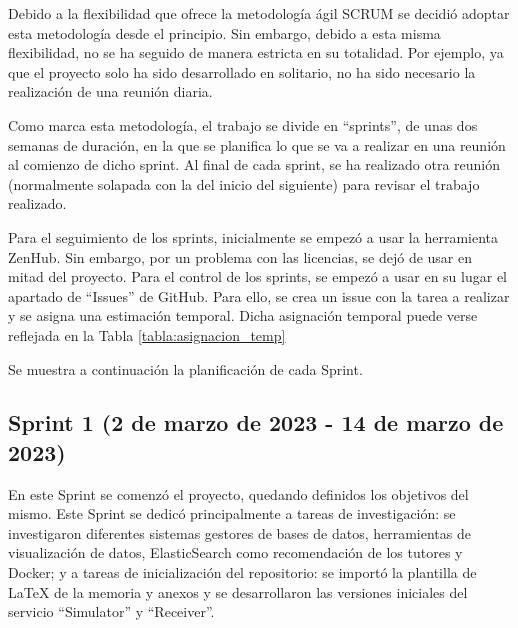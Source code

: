 Debido a la flexibilidad que ofrece la metodología ágil SCRUM \cite{schwaber2001agile} se decidió adoptar 
esta metodología desde el principio. Sin embargo, debido a esta misma flexibilidad, no se ha seguido de 
manera estricta en su totalidad. Por ejemplo, ya que el proyecto solo ha sido desarrollado en solitario, no ha 
sido necesario la realización de una reunión diaria.

Como marca esta metodología, el trabajo se divide en ``sprints'', de unas dos semanas de duración, en la que 
se planifica lo que se va a realizar en una reunión al comienzo de dicho sprint. Al final de cada sprint, se
ha realizado otra reunión (normalmente solapada con la del inicio del siguiente) para revisar el trabajo realizado.

Para el seguimiento de los sprints, inicialmente se empezó a usar la herramienta ZenHub. Sin embargo, por un problema
con las licencias, se dejó de usar en mitad del proyecto. Para el control de los sprints, se empezó a usar en su 
lugar el apartado de ``Issues'' de GitHub. Para ello, se crea un issue con la tarea a realizar y se asigna una estimación 
temporal. Dicha asignación temporal puede verse reflejada en la Tabla \ref{tabla:asignacion_temp}


Se muestra a continuación la planificación de cada Sprint.

\subsection{Sprint 1 (2 de marzo de 2023 - 14 de marzo de 2023)}

En este Sprint se comenzó el proyecto, quedando definidos los objetivos del mismo. Este Sprint se dedicó principalmente 
a tareas de investigación: se investigaron diferentes sistemas gestores de bases de datos, herramientas de visualización 
de datos, ElasticSearch como recomendación de los tutores y Docker; y a tareas de inicialización del repositorio: se 
importó la plantilla de LaTeX de la memoria y anexos y se desarrollaron las versiones iniciales del servicio ``Simulator'' y 
``Receiver''.

